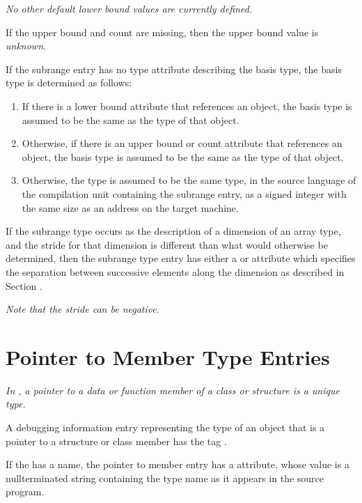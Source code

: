 \textit{No other default lower bound values are currently defined.}

If the upper bound and count are missing, then the upper bound value is 
\textit{unknown}.

If the subrange entry has no type attribute describing the
basis type, the basis type is determined as follows:
\begin{enumerate}[1. ]
\item
If there is a lower bound attribute that references an object,
the basis type is assumed to be the same as the type of that object.
\item
Otherwise, if there is an upper bound or count attribute that references
an object, the basis type is assumed to be the same as the type of that object.
\item
Otherwise, the type is
assumed to be the same type, in the source language of the
compilation unit containing the subrange entry, as a signed
integer with the same size as an address on the target machine.
\end{enumerate}

If the subrange type occurs as the description of a dimension
of an array type, and the stride for that dimension is
\hypertarget{chap:DWATbytestridesubrangestridedimensionofarraytype}{}
different than what would otherwise be determined, then
\hypertarget{chap:DWATbitstridesubrangestridedimensionofarraytype}{}
the subrange type entry has either 
a 
\DWATbytestride{} or
\DWATbitstride{} attribute 
which specifies the separation
between successive elements along the dimension as described
in 
Section .

\textit{Note that the stride can be negative.}

\section{Pointer to Member Type Entries}
\label{chap:pointertomembertypeentries}

\textit{In , a 
pointer to a data or function member of a class or
structure is a unique type.}

A debugging information entry representing the type of an
object that is a pointer to a structure or class member has
the tag \DWTAGptrtomembertypeTARG.

If the  has a name, the 
pointer to member entry has a
\DWATname{} attribute, 
whose value is a
null\dash terminated string containing the type name as it appears
in the source program.

